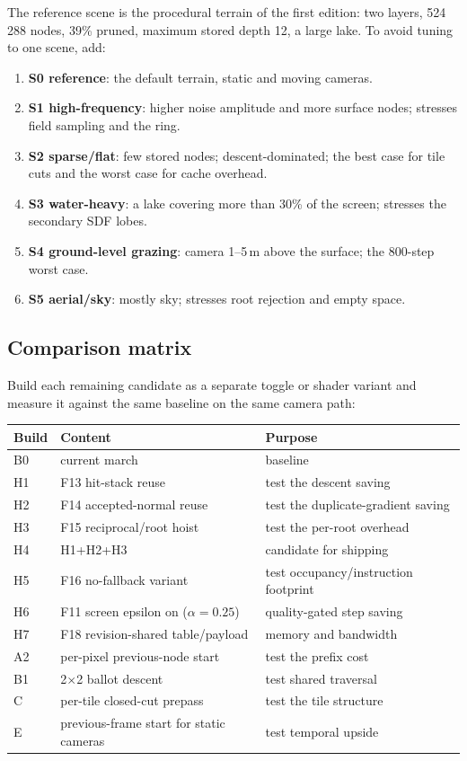 \documentclass[11pt,a4paper]{article}
\theoremstyle{plain}
\theoremstyle{definition}
\theoremstyle{remark}
\begin{document}
The reference scene is the procedural terrain of the first edition: two layers,
524\,288 nodes, 39\% pruned, maximum stored depth 12, a large lake. To avoid
tuning to one scene, add:
\begin{enumerate}[leftmargin=1.4em,itemsep=1pt]
\item \textbf{S0 reference}: the default terrain, static and moving cameras.
\item \textbf{S1 high-frequency}: higher noise amplitude and more surface
      nodes; stresses field sampling and the ring.
\item \textbf{S2 sparse/flat}: few stored nodes; descent-dominated; the best
      case for tile cuts and the worst case for cache overhead.
\item \textbf{S3 water-heavy}: a lake covering more than 30\% of the screen;
      stresses the secondary SDF lobes.
\item \textbf{S4 ground-level grazing}: camera 1--5\,m above the surface; the
      800-step worst case.
\item \textbf{S5 aerial/sky}: mostly sky; stresses root rejection and empty
      space.
\end{enumerate}

\subsection{Comparison matrix}

Build each remaining candidate as a separate toggle or shader variant and
measure it against the same baseline on the same camera path:

\begin{center}
\small
\begin{tabularx}{\linewidth}{@{}llX@{}}
\toprule
Build & Content & Purpose \\
\midrule
B0 & current march & baseline \\
H1 & F13 hit-stack reuse & test the descent saving \\
H2 & F14 accepted-normal reuse & test the duplicate-gradient saving \\
H3 & F15 reciprocal/root hoist & test the per-root overhead \\
H4 & H1+H2+H3 & candidate for shipping \\
H5 & F16 no-fallback variant & test occupancy/instruction footprint \\
H6 & F11 screen epsilon on ($\alpha=0.25$) & quality-gated step saving \\
H7 & F18 revision-shared table/payload & memory and bandwidth \\
A2 & per-pixel previous-node start & test the prefix cost \\
B1 & 2$\times$2 ballot descent & test shared traversal \\
C & per-tile closed-cut prepass & test the tile structure \\
E & previous-frame start for static cameras & test temporal upside \\
\bottomrule
\end{tabularx}
\end{center}
\end{document}
